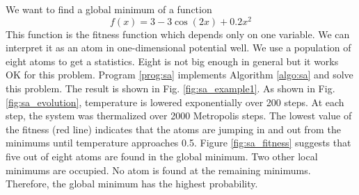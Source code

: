 \bigskip
\begin{example}\label{ex:sa}

\medskip
\noindent
We want to find a global minimum of a function 
\begin{equation}
f(x) = 3-3\cos(2x)+0.2 x^2
\end{equation}
This function is the fitness function which depends only on one variable.  We can interpret it as an atom in one-dimensional potential well. We use a population of eight atoms to get a statistics.  Eight is not big enough in general but it works OK for this problem.
Program \ref{prog:sa} implements Algorithm \ref{algo:sa} and solve this problem.  The result is shown in Fig. \ref{fig:sa_example1}.  As shown in Fig. \ref{fig:sa_evolution}, temperature is lowered exponentially over 200 steps.  At each step, the system was thermalized over 2000 Metropolis steps.  The lowest value of the fitness (red line) indicates that the atoms are jumping in and out from the minimums until temperature approaches 0.5.  Figure \ref{fig:sa_fitness} suggests that five out of eight atoms are found in the global minimum.  Two other local minimums are occupied.  No atom is found at the remaining minimums.  Therefore, the global minimum has the highest probability.



\end{example}
